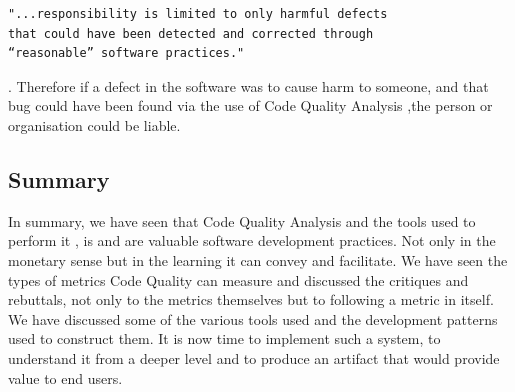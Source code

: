 \begin{verbatim}
"...responsibility is limited to only harmful defects
that could have been detected and corrected through 
“reasonable” software practices." 
\end{verbatim} \cite{legalLiability}.
Therefore if a defect in the software was to cause harm to someone, and that bug could have been found via the use of Code Quality Analysis 
,the person or organisation could be liable.

\subsection{Summary}
In summary, we have seen that Code Quality Analysis and the tools used to perform it , is and are valuable software development practices. Not only in 
the monetary sense but in the learning it can convey and facilitate. We have seen the types of metrics Code Quality can measure and discussed the 
critiques and rebuttals, not only to the metrics themselves but to following a metric in itself. We have discussed some of the various tools used 
and the development patterns used to construct them.
\newline
It is now time to implement such a system, to understand it from a deeper level and to produce an artifact that would provide value to end users.




